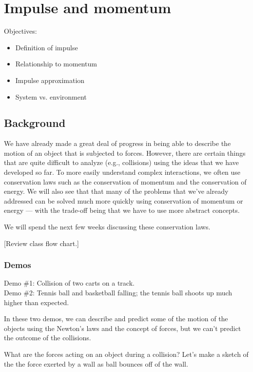 \section{Impulse and momentum}
Objectives:
\begin{itemize}
\item Definition of impulse
\item Relationship to momentum
\item Impulse approximation
\item System vs. environment
\end{itemize}

\subsection{Background}
We have already made a great deal of progress in being able to describe the motion of an object that is subjected to forces. However, there are certain things that are quite difficult to analyze (e.g., collisions) using the ideas that we have developed so far. To more easily understand complex interactions, we often use conservation laws such as the conservation of momentum and the conservation of energy. We will also see that that many of the problems that we've already addressed can be solved much more quickly using conservation of momentum or energy --- with the trade-off being that we have to use more abstract concepts.

We will spend the next few weeks discussing these conservation laws.

[Review class flow chart.]
\vspace{8cm}

\subsubsection*{Demos}
Demo \#1: Collision of two carts on a track.\\
Demo \#2: Tennis ball and basketball falling; the tennis ball shoots up much higher than expected.

In these two demos, we can describe and predict some of the motion of the objects using the Newton's laws and the concept of forces, but we can't predict the outcome of the collisions.

What are the forces acting on an object during a collision? Let's make a sketch of the the force exerted by a wall as ball bounces off of the wall.

\vspace{5cm}

